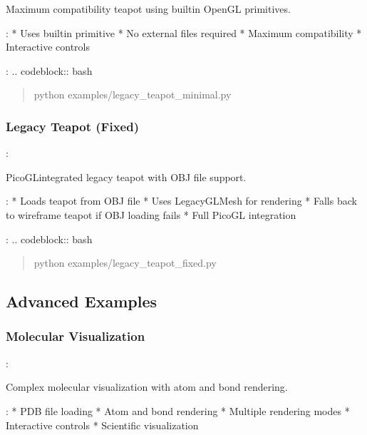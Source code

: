 \documentclass[a4paper,10pt,english,openany,oneside]{sphinxmanual}
\begin{document}
\sphinxAtStartPar
Maximum compatibility teapot using built\sphinxhyphen{}in OpenGL primitives.

\sphinxAtStartPar
{}:
* Uses  built\sphinxhyphen{}in primitive
* No external files required
* Maximum compatibility
* Interactive controls

\sphinxAtStartPar
{}:
.. code\sphinxhyphen{}block:: bash
\begin{quote}

\sphinxAtStartPar
python examples/legacy\_teapot\_minimal.py
\end{quote}


\subsubsection{Legacy Teapot (Fixed)}
\label{\detokenize{examples:legacy-teapot-fixed}}
\sphinxAtStartPar
{}: 

\sphinxAtStartPar
PicoGL\sphinxhyphen{}integrated legacy teapot with OBJ file support.

\sphinxAtStartPar
{}:
* Loads teapot from OBJ file
* Uses LegacyGLMesh for rendering
* Falls back to wireframe teapot if OBJ loading fails
* Full PicoGL integration

\sphinxAtStartPar
{}:
.. code\sphinxhyphen{}block:: bash
\begin{quote}

\sphinxAtStartPar
python examples/legacy\_teapot\_fixed.py
\end{quote}


\subsection{Advanced Examples}
\label{\detokenize{examples:advanced-examples}}

\subsubsection{Molecular Visualization}
\label{\detokenize{examples:molecular-visualization}}
\sphinxAtStartPar
{}: 

\sphinxAtStartPar
Complex molecular visualization with atom and bond rendering.

\sphinxAtStartPar
{}:
* PDB file loading
* Atom and bond rendering
* Multiple rendering modes
* Interactive controls
* Scientific visualization
\end{document}
